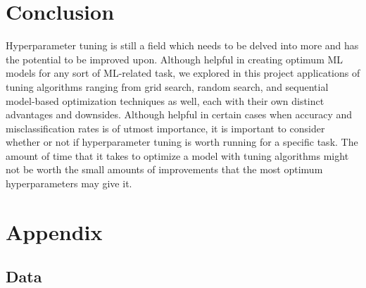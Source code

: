 \documentclass[12pt]{article}
\begin{document}
\newpage

\hypertarget{conclusion}{%
\section{Conclusion}\label{conclusion}}

\label{sec:conclusion}

Hyperparameter tuning is still a field which needs to be delved into
more and has the potential to be improved upon. Although helpful in
creating optimum ML models for any sort of ML-related task, we explored
in this project applications of tuning algorithms ranging from grid
search, random search, and sequential model-based optimization
techniques as well, each with their own distinct advantages and
downsides. Although helpful in certain cases when accuracy and
misclassification rates is of utmost importance, it is important to
consider whether or not if hyperparameter tuning is worth running for a
specific task. The amount of time that it takes to optimize a model with
tuning algorithms might not be worth the small amounts of improvements
that the most optimum hyperparameters may give it.

\newpage

\hypertarget{appendix}{%
\section{Appendix}\label{appendix}}

\label{sec:appendix}

\hypertarget{data}{%
\subsection{Data}\label{data}}
\end{document}
